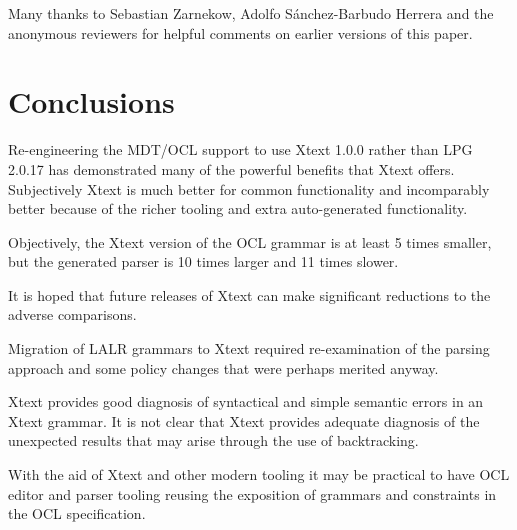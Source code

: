 \documentclass[runningheads,a4paper]{llncs}
\begin{document}
Many thanks to Sebastian Zarnekow, Adolfo S\'anchez-Barbudo Herrera and the anonymous reviewers for helpful comments on earlier versions of this paper.

\section{Conclusions}

Re-engineering the MDT/OCL support to use Xtext 1.0.0 rather than LPG 2.0.17 has demonstrated many of the powerful benefits that Xtext offers. Subjectively Xtext is much better for common functionality and incomparably better because of the  richer tooling and extra auto-generated functionality.

Objectively, the Xtext version of the OCL grammar is at least 5 times smaller, but the generated parser is 10 times larger and 11 times slower.

It is hoped that future releases of Xtext can make significant reductions to the adverse comparisons.

Migration of LALR grammars to Xtext required re-examination of the parsing approach and some policy changes that were perhaps merited anyway.

Xtext provides good diagnosis of syntactical and simple semantic errors in an Xtext grammar. It is not clear that Xtext provides adequate diagnosis of the unexpected results that may arise through the use of backtracking.

With the aid of Xtext and other modern tooling it may be practical to have OCL editor and parser tooling reusing the exposition of grammars and constraints in the OCL specification.
\end{document}
